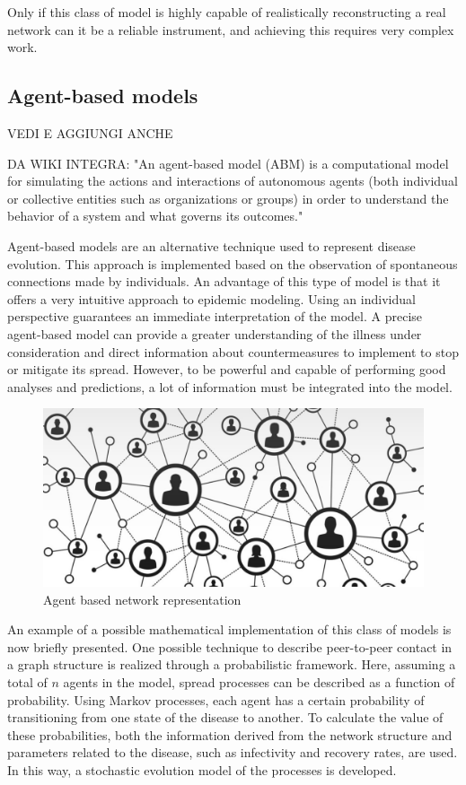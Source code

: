 Only if this class of model is highly capable of realistically reconstructing a real network can it be a reliable instrument, and achieving this requires very complex work.
\subsection{Agent-based models}

VEDI E AGGIUNGI ANCHE \cite{Tizzoni2014}

DA WIKI INTEGRA: "An agent-based model (ABM) is a computational model for simulating the actions and interactions of autonomous agents (both individual or collective entities such as organizations or groups) in order to understand the behavior of a system and what governs its outcomes."

Agent-based models are an alternative technique used to represent disease evolution. This approach is implemented based on the observation of spontaneous connections made by individuals. 
An advantage of this type of model is that it offers a very intuitive approach to epidemic modeling. Using an individual perspective guarantees an immediate interpretation of the model. A precise agent-based model can provide a greater understanding of the illness under consideration and direct information about countermeasures to implement to stop or mitigate its spread. However, to be powerful and capable of performing good analyses and predictions, a lot of information must be integrated into the model. 
\begin{figure}
	\centering
	\includegraphics[width=0.5\linewidth]{0_introduction/images_introduction/agent_based}
	\caption[Agent based network representation]{Agent based network representation}
	\label{fig:agentbased}
\end{figure}


An example of a possible mathematical implementation of this class of models is now briefly presented. One possible technique to describe peer-to-peer contact in a graph structure is realized through a probabilistic framework. Here, assuming a total of $n$ agents in the model, spread processes can be described as a function of probability. Using Markov processes, each agent has a certain probability of transitioning from one state of the disease to another. To calculate the value of these probabilities, both the information derived from the network structure and parameters related to the disease, such as infectivity and recovery rates, are used. In this way, a stochastic evolution model of the processes is developed.

